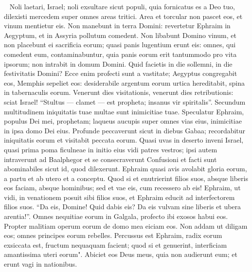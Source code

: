 \begin{biblechapter}   
\verse Noli laetari, Israel; noli exsultare sicut populi, quia fornicatus es a Deo tuo, dilexisti mercedem super omnes areas tritici. 
\verse Area et torcular non pascet eos, et vinum mentietur eis. 
\verse Non manebunt in terra Domini: revertetur Ephraim in Aegyptum, et in Assyria pollutum comedent. 
\verse Non libabunt Domino vinum, et non placebunt ei sacrificia eorum; quasi panis lugentium erunt eis: omnes, qui comedent eum, contaminabuntur, quia panis eorum erit tantummodo pro vita ipsorum; non intrabit in domum Domini. 
\verse Quid facietis in die sollemni, in die festivitatis Domini? 
\verse Ecce enim profecti sunt a vastitate; Aegyptus congregabit eos, Memphis sepeliet eos: desiderabile argentum eorum urtica hereditabit, spina in tabernaculis eorum. 
\verse Venerunt dies visitationis, venerunt dies retributionis: sciat Israel! “Stultus — clamet — est propheta; insanus vir spiritalis”. Secundum multitudinem iniquitatis tuae multae sunt inimicitiae tuae. 
\verse Speculatur Ephraim, populus Dei mei, prophetam; laqueus aucupis super omnes vias eius, inimicitiae in ipsa domo Dei eius. 
\verse Profunde peccaverunt sicut in diebus Gabaa; recordabitur iniquitatis eorum et visitabit peccata eorum. 
\verse Quasi uvas in deserto inveni Israel, quasi prima poma ficulneae in initio eius vidi patres vestros; ipsi autem intraverunt ad Baalphegor et se consecraverunt Confusioni et facti sunt abominabiles sicut id, quod dilexerunt. 
\verse Ephraim quasi avis avolabit gloria eorum, a partu et ab utero et a conceptu. 
\verse Quod si et enutrierint filios suos, absque liberis eos faciam, absque hominibus; sed et vae eis, cum recessero ab eis! 
\verse Ephraim, ut vidi, in venationem posuit sibi filios suos, et Ephraim educit ad interfectorem filios suos. 
\verse “Da eis, Domine! Quid dabis eis? Da eis vulvam sine liberis et ubera arentia!”. 
\verse Omnes nequitiae eorum in Galgala, profecto ibi exosos habui eos. Propter malitiam operum eorum de domo mea eiciam eos. Non addam ut diligam eos; omnes principes eorum rebelles. 
\verse Percussus est Ephraim, radix eorum exsiccata est, fructum nequaquam facient; quod si et genuerint, interficiam amantissima uteri eorum". 
\verse Abiciet eos Deus meus, quia non audierunt eum; et erunt vagi in nationibus. 
\end{biblechapter}

